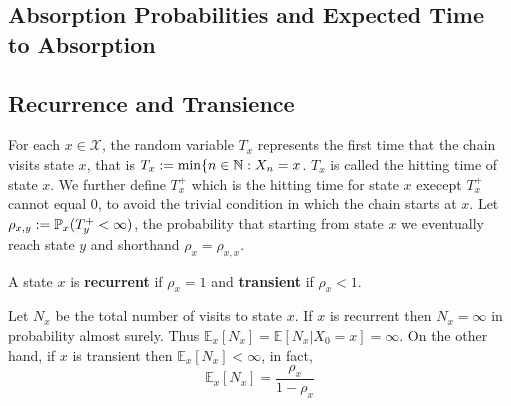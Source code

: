 \documentclass[11pt]{scrartcl}
\begin{document}
\subsection{Absorption Probabilities and Expected Time to Absorption}

\subsection{Recurrence and Transience}
For each $x\in \mathcal{X} $, the random variable $T_{x} $ represents the first
time that the chain visits state $x$, that is $T_{x}:= \min \{n\in \mathbb{N}: X_{n}
  = x $. $T_{x} $ is called the hitting time of state $x$. We further define
  $T_{x}^{+}  $ which is the hitting time for state $x$ execept $T_{x}^{+}
  $ cannot equal 0, to avoid the trivial condition in which the chain starts at
  $x$. 
  Let $\rho_{x,y}:=\mathbb{P}_x(T_{y}^{+} < \infty  )$, the probability that starting
  from state $x$ we eventually reach state $y$ and shorthand
  $\rho_{x}=\rho_{x,x}  $. 
  \begin{definition}
    A state $x$ is \textbf{recurrent}  if $\rho_{x}=1 $ and \textbf{transient}
  if $\rho_{x}<1 $.
  \end{definition}
  \begin{proposition}
    Let $N_{x} $ be the total number of visits to state $x$. If $x$ is
    recurrent then $N_{x}=\infty $ in probability almost surely. Thus
    $\mathbb{E}_{x} [N_{x} ] = \mathbb{E} [N_{x} | X_{0}=x  ] =\infty$. On
    the other hand, if $x$ is transient then $\mathbb{E}_{x} [N_{x}
    ] < \infty$, in fact, \[
      \mathbb{E}_{x} [N_{x} ]  = \frac{\rho_{x}}{1-\rho_{x}}
    \]  
  \end{proposition}
\end{document}
